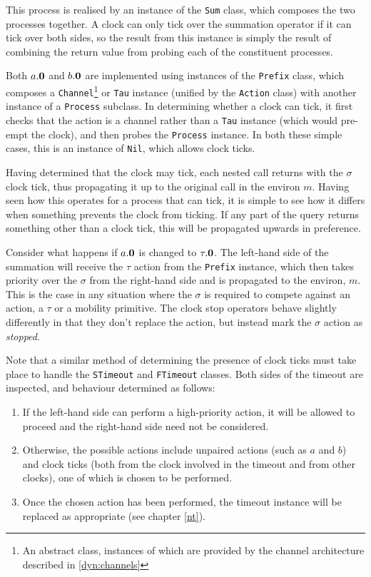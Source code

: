 This process is realised by an instance of the \texttt{Sum} class, which
composes the two processes together.  A clock can only tick over the
summation operator if it can tick over both sides, so the result from
this instance is simply the result of combining the return value from
probing each of the constituent processes.

Both $a.\textbf{0}$ and $b.\textbf{0}$ are implemented using instances of the
\texttt{Prefix} class, which composes a \texttt{Channel}\footnote{An
abstract class, instances of which are provided by the channel
architecture described in \ref{dyn:channels}} or \texttt{Tau} instance
(unified by the \texttt{Action} class) with another instance of a
\texttt{Process} subclass.  In determining whether a clock can tick, it
first checks that the action is a channel rather than a \texttt{Tau}
instance (which would pre-empt the clock), and then probes the
\texttt{Process} instance.  In both these simple cases, this is an
instance of \texttt{Nil}, which allows clock ticks.

Having determined that the clock may tick, each nested call returns with
the $\sigma$ clock tick, thus propagating it up to the original call in
the environ $m$.  Having seen how this operates for a process that can
tick, it is simple to see how it differs when something prevents the
clock from ticking.  If any part of the query returns something other
than a clock tick, this will be propagated upwards in preference.

Consider what happens if $a.\textbf{0}$ is changed to $\tau.\textbf{0}$.  The
left-hand side of the summation will receive the $\tau$ action from the
\texttt{Prefix} instance, which then takes priority over the $\sigma$
from the right-hand side and is propagated to the environ, $m$.  This is
the case in any situation where the $\sigma$ is required to compete
against an action, a $\tau$ or a mobility primitive.  The clock stop
operators behave slightly differently in that they don't replace the
action, but instead mark the $\sigma$ action as \emph{stopped}.

Note that a similar method of determining the presence of clock ticks
must take place to handle the \texttt{STimeout} and \texttt{FTimeout}
classes.  Both sides of the timeout are inspected, and behaviour
determined as follows:
\begin{enumerate}
\item If the left-hand side can perform a high-priority action, it will
      be allowed to proceed and the right-hand side need not be
      considered.
\item Otherwise, the possible actions include unpaired actions (such as
      $a$ and $b$) and clock ticks (both from the clock involved in the
      timeout and from other clocks), one of which is chosen to be
      performed.
\item Once the chosen action has been performed, the timeout instance
      will be replaced as appropriate (see chapter \ref{nt}). 
\end{enumerate}

